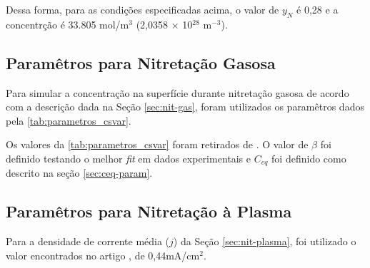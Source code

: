 Dessa forma, para as condições especificadas acima, o valor de $y_N$ é 0,28 e a concentrção é 33.805 mol/m$^3$ (2,0358 $\times$ 10$^{28}$ m$^{-3}$).

\begin{table}[ht]
\centering
\setlength{\doublerulesep}{\arrayrulewidth}
{\def\arraystretch{2}\tabcolsep=10pt
\caption{Parâmetros para concentração na superfície constante}
}
\end{table}


\subsection{Paramêtros para Nitretação Gasosa}
\label{sec:param-gas}
Para simular a concentração na superfície durante nitretação gasosa de acordo com a descrição dada na Seção \autoref{sec:nit-gas}, foram utilizados os paramêtros dados pela \autoref{tab:parametros_csvar}.

\begin{table}[!htb]
\centering
\setlength{\doublerulesep}{\arrayrulewidth}
{\def\arraystretch{2}\tabcolsep=10pt
\caption{Parâmetros para concentração na superfície variável - nitretação gasosa}
}
\end{table}

Os valores da \autoref{tab:parametros_csvar} foram retirados de \cite{christiansen2008nitrogen}. O valor de $\beta$ foi definido testando o melhor \textit{fit} em dados experimentais e $C_{eq}$ foi definido como descrito na seção \autoref{sec:ceq-param}.


\subsection{Paramêtros para Nitretação à Plasma}
\label{sec:param-plasma}

Para a densidade de corrente média ($j$) da Seção \ref{sec:nit-plasma}, foi utilizado o valor encontrados no artigo \cite{galdikas2011modeling}, de 0,44mA/cm$^{2}$. 
